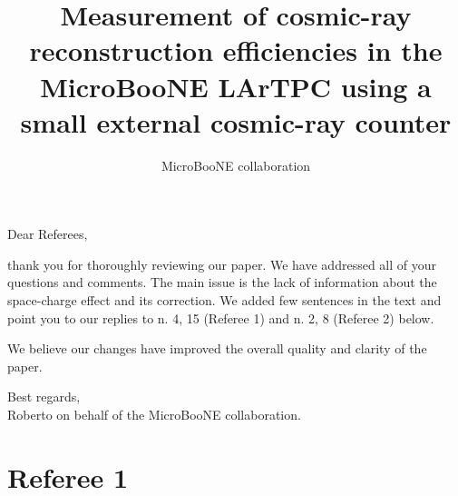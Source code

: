 \documentclass[review,number,sort&compress]{article}
\title{Measurement of cosmic-ray reconstruction efficiencies in the MicroBooNE LArTPC using a small external cosmic-ray counter}
\author{MicroBooNE collaboration}
\begin{document}
\maketitle

\noindent Dear Referees,

thank you for thoroughly reviewing our paper. We have addressed all of your questions and comments. The main issue is the lack of information about the space-charge effect and its correction. We added few sentences in the text and point you to our replies to n. 4, 15 (Referee 1) and n. 2, 8 (Referee 2) below.

We believe our changes have improved the overall quality and clarity of the
paper.

\noindent Best regards,\\
\indent Roberto on behalf of the MicroBooNE collaboration.


\section{\bf Referee 1}
\end{document}
